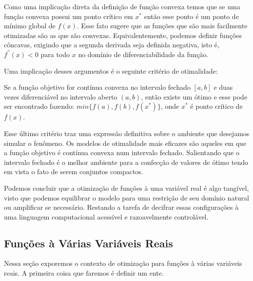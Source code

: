 \par Como uma implicação direta da definição de função convexa temos que se uma função convexa possui um ponto crítico em $x^{*}$ então esse ponto é um ponto de mínimo global de $f(x)$. Esse fato sugere que as funções que são mais facilmente otimizadas são as que são convexas. Equivalentemente, podemos definir funções côncavas, exigindo que a segunda derivada seja definida negativa, isto é, $f^{''}(x) < 0$ para todo $x$ no domínio de diferenciabilidade da função.
\par Uma implicação desses argumentos é o seguinte critério de otimalidade:

\begin{theorem}
  Se a função objetivo for contínua convexa no intervalo fechado $[a,b]$ e duas vezes diferenciável no intervalo aberto $(a,b)$, então existe um ótimo e esse pode ser encontrado fazendo: $min\{f(a), f(b), f(x^{*})\}$, onde $x^{*}$ é ponto crítico de $f(x)$. 
\end{theorem}

\par Esse último critério traz uma expressão definitiva sobre o ambiente que desejamos simular o fenômeno. Os modelos de otimalidade mais eficazes são aqueles em que a função objetivo é contínua convexa num intervalo fechado. Salientando que o intervalo fechado é o melhor ambiente para a confecção de valores de ótimo tendo em vista o fato de serem conjuntos compactos. 
\par Podemos concluir que a otimização de funções à uma variável real é algo tangível, visto que podemos equilibrar o modelo para uma restrição de seu domínio natural ou amplificar se necessário. Restando a tarefa de decifrar essas configurações à uma linguagem computacional acessível e razoavelmente controlável.




\subsection{Funções à Várias Variáveis Reais}

\par Nessa seção exporemos o contexto de otimização para funções à várias variáveis reais. A primeira coisa que faremos é definir um ente.

